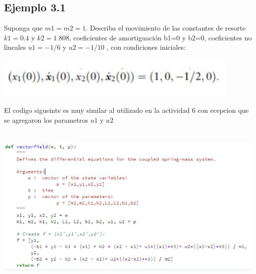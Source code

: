 \documentclass{article}
\begin{document}

\subsection{Ejemplo 3.1}

Suponga que $m1=m2=1$. Describa el movimiento de las constantes de resorte $k1=0.4$ y $k2=1.808$, coeficientes de amortiguación b1=0 y b2=0, coeficientes no lineales $u1=-1/6$ y $u2=-1/10$ , con condiciones iniciales:


\begin{center}
\includegraphics[height=2cm]{ec15.png}
\end{center}

El codigo sigueinte es muy similar al utilizado en la actividad 6 con ecepcion que se agregaron los parametros $u1$ y $u2$

\begin{center}
\includegraphics[height=8cm]{cod7.png}
\end{center}
\end{document}
